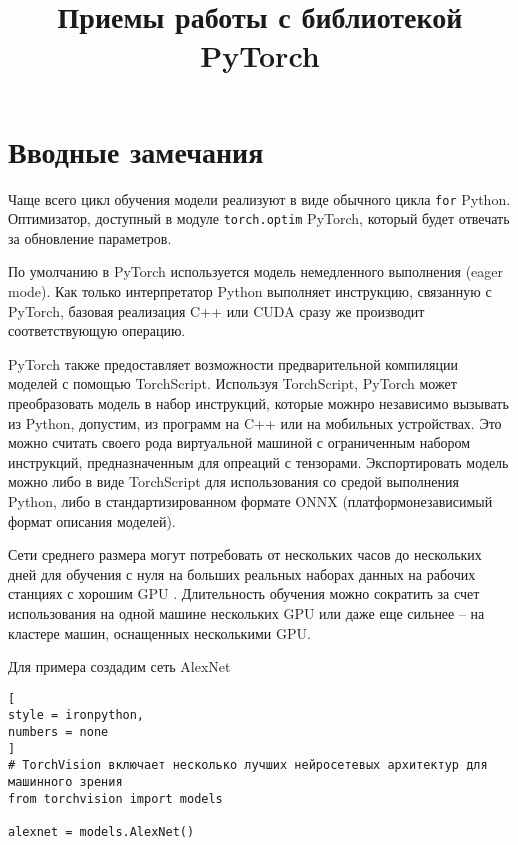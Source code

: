 \documentclass[%
	11pt,
	a4paper,
	utf8,
		]{article}
\begin{document}
\title{Приемы работы с библиотекой PyTorch}

\author{}

\date{}
\maketitle

\thispagestyle{fancy}

\tableofcontents

\section{Вводные замечания}

Чаще всего цикл обучения модели реализуют в виде обычного цикла \verb|for| Python. Оптимизатор, доступный в модуле \verb|torch.optim| PyTorch, который будет отвечать за обновление параметров. 

По умолчанию в PyTorch используется модель немедленного выполнения (eager mode). Как только интерпретатор Python выполняет инструкцию, связанную с PyTorch, базовая реализация C++ или CUDA сразу же производит соответствующую операцию.

PyTorch также предоставляет возможности предварительной компиляции моделей с помощью TorchScript. Используя TorchScript, PyTorch может преобразовать модель в набор инструкций, которые можнро независимо вызывать из Python, допустим, из программ на C++ или на мобильных устройствах. Это можно считать своего рода виртуальной машиной с ограниченным набором инструкций, предназначенным для опреаций с тензорами. Экспортировать модель можно либо в виде TorchScript для использования со средой выполнения Python, либо в стандартизированном формате ONNX (платформонезависимый формат описания моделей).

Сети среднего размера могут потребовать от нескольких часов до нескольких дней для обучения с нуля на больших реальных наборах данных на рабочих станциях с хорошим GPU \cite[]{pytorch-2022}. Длительность обучения можно сократить за счет использования на одной машине нескольких GPU или даже еще сильнее -- на кластере машин, оснащенных несколькими GPU. 

Для примера создадим сеть AlexNet
\begin{lstlisting}[
style = ironpython,
numbers = none	
]
# TorchVision включает несколько лучших нейросетевых архитектур для машинного зрения
from torchvision import models

alexnet = models.AlexNet()
\end{lstlisting}
\end{document}
